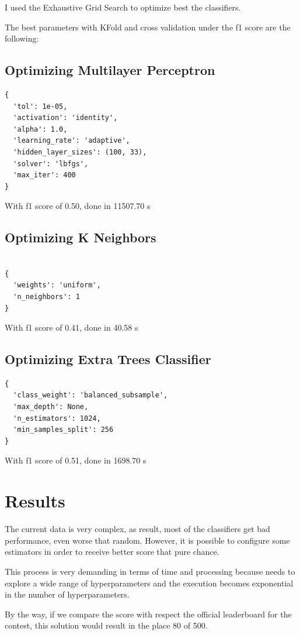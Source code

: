 \documentclass[a4paper]{article}
\begin{document}
I used the Exhaustive Grid Search to optimize best the classifiers.


\noindent The best parameters with KFold and cross validation
under the f1 score are the following:

\subsection{Optimizing Multilayer Perceptron}

\begin{verbatim}
{
  'tol': 1e-05,
  'activation': 'identity',
  'alpha': 1.0,
  'learning_rate': 'adaptive',
  'hidden_layer_sizes': (100, 33),
  'solver': 'lbfgs',
  'max_iter': 400
}
\end{verbatim}
With f1 score of 0.50, done in 11507.70 s

\subsection{Optimizing K Neighbors}
\begin{verbatim}

{
  'weights': 'uniform',
  'n_neighbors': 1
}
\end{verbatim}
With f1 score of 0.41, done in 40.58 s
\subsection{Optimizing Extra Trees Classifier}
\begin{verbatim}
{
  'class_weight': 'balanced_subsample',
  'max_depth': None,
  'n_estimators': 1024,
  'min_samples_split': 256
}
\end{verbatim}

With f1 score of 0.51, done in 1698.70 s

\section{Results}

The current data is very complex, as result, most of the
classifiers get bad performance, even worse that random. However,
it is possible to configure some estimators in order to receive
better score that pure chance.

This process is very demanding in terms of time and processing because
needs to explore a wide range of hyperparameters and the execution
becomes exponential in the number of hyperparameters.

By the way, if we compare the score with respect the official
leaderboard for the contest, this solution would result in the
place 80 of 500.

{}

\end{document}
